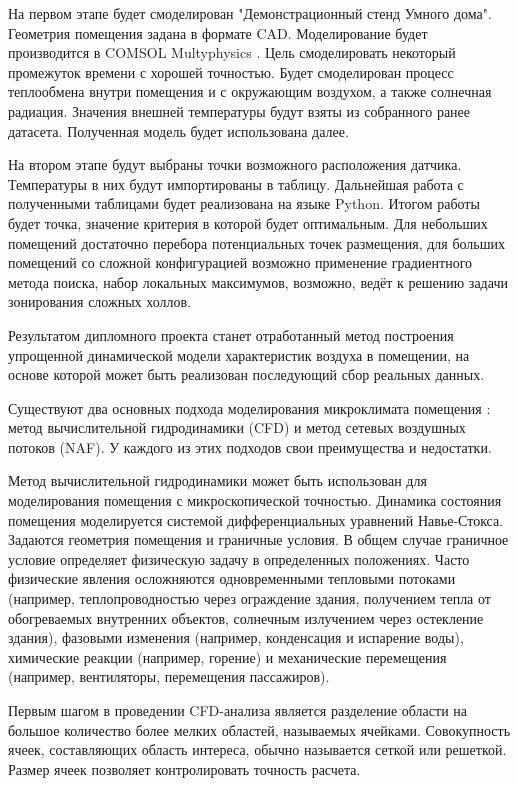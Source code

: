 На первом этапе будет смоделирован "Демонстрационный стенд Умного дома". Геометрия помещения задана в формате CAD. Моделирование будет производится в COMSOL Multyphysics \cite{comsol}. Цель смоделировать некоторый промежуток времени с хорошей точностью. Будет смоделирован процесс теплообмена внутри помещения и с окружающим воздухом, а также солнечная радиация. Значения внешней температуры будут взяты из собранного ранее датасета. Полученная модель будет использована далее.

На втором этапе будут выбраны точки возможного расположения датчика. Температуры в них будут импортированы в таблицу. Дальнейшая работа с полученными таблицами будет реализована на языке Python. Итогом работы будет точка, значение критерия в которой будет оптимальным. Для небольших помещений достаточно перебора потенциальных точек размещения, для больших помещений со сложной конфигурацией возможно применение градиентного метода поиска, набор локальных максимумов, возможно, ведёт к решению задачи зонирования сложных холлов.

\newpage

Результатом дипломного проекта станет отработанный метод построения упрощенной динамической модели характеристик воздуха в помещении, на основе которой может быть реализован последующий сбор реальных данных.

\newpage


Существуют два основных подхода моделирования микроклимата помещения \cite{ashrae}: метод вычислительной гидродинамики (CFD) и метод сетевых воздушных потоков (NAF). У каждого из этих подходов свои преимущества и недостатки.

Метод вычислительной гидродинамики может быть использован для моделирования помещения с микроскопической точностью. Динамика состояния помещения моделируется системой дифференциальных уравнений Навье-Стокса. Задаются геометрия помещения и граничные условия. В общем случае граничное условие определяет физическую задачу в определенных положениях. Часто физические явления осложняются одновременными тепловыми потоками (например, теплопроводностью через ограждение здания, получением тепла от обогреваемых внутренних объектов, солнечным излучением через остекление здания), фазовыми изменения (например, конденсация и испарение воды), химические реакции (например, горение) и механические перемещения (например, вентиляторы, перемещения пассажиров).

Первым шагом в проведении CFD-анализа является разделение области на большое количество более мелких областей, называемых ячейками. Совокупность ячеек, составляющих область интереса, обычно называется сеткой или решеткой. Размер ячеек позволяет контролировать точность расчета.

